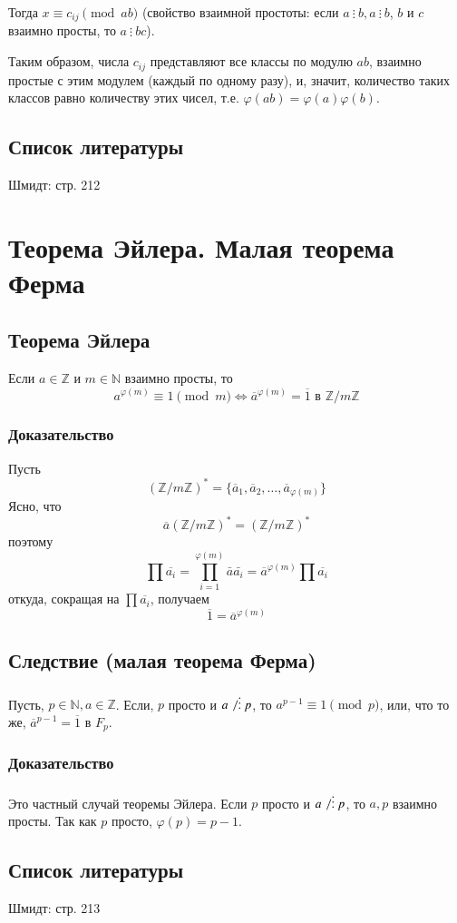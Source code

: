 \documentclass{article}
\newcommand{\divs}{~\vdots~}
\begin{document}
Тогда $x \equiv c_{ij} \pmod{ab}$ (свойство взаимной простоты: если $a \divs b, a \divs b$, $b$ и $c$ взаимно просты, то $a \divs bc$).

Таким образом, числа $c_{ij}$ представляют все классы по модулю $ab$, взаимно простые с этим модулем (каждый по одному разу), и, значит, количество таких классов равно количеству этих чисел, т.е. $\varphi(ab) = \varphi(a)\varphi(b)$.

\subsection*{Список литературы}
Шмидт: стр. 212


\newpage
\section{Теорема Эйлера. Малая теорема Ферма}
\subsection{Теорема Эйлера}
Если $a \in \mathbb Z$ и $m \in \mathbb N$ взаимно просты, то
\[a^{\varphi(m)} \equiv 1 \pmod{m} \Leftrightarrow \overline{a}^{\varphi(m)} = \overline 1 \text{ в } \mathbb Z /m \mathbb Z\]

\subsubsection*{Доказательство}
Пусть \[(\mathbb Z/m \mathbb Z)^* = \{\overline{a}_1, \overline{a}_2, \dots, \overline{a}_{\varphi(m)}\}\] Ясно, что \[\overline{a}(\mathbb Z/m \mathbb Z)^* = (\mathbb Z/m \mathbb Z)^*\] поэтому \[\prod \overline{a_i} = \prod_{i=1}^{\varphi(m)} \bar{a} \bar{a_i} = \overline{a}^{\varphi(m)} \prod \overline{a_i}\] откуда, сокращая на $\prod \overline{a_i}$, получаем \[\overline{1} = \overline{a}^{\varphi(m)}\]

\subsection{Следствие (малая теорема Ферма)}
Пусть, $p \in \mathbb N, a \in \mathbb Z$. Если, $p$ просто и $a \not \divs p$, то $a^{p-1} \equiv 1 \pmod{p}$, или, что то же, $\overline{a}^{p-1} = \overline{1} \text{ в } F_p$.

\subsubsection*{Доказательство}
Это частный случай теоремы Эйлера. Если $p$ просто и $a \not \divs p$, то $a, p$ взаимно просты. Так как $p$ просто, $\varphi(p) = p-1$.

\subsection*{Список литературы}
Шмидт: стр. 213
\end{document}

